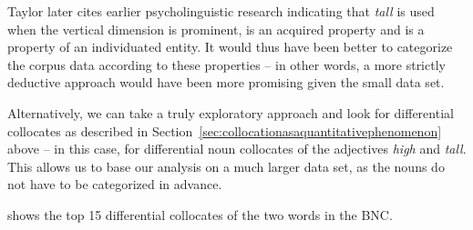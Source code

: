 Taylor later cites earlier psycholinguistic  research indicating that \textit{tall} is used when the vertical dimension is prominent, is an acquired property and is a property of an individuated entity. It would thus have been better to categorize  the corpus data according to these properties -- in other words, a more strictly deductive  approach would have been more promising given the small data set.

Alternatively, we can take a truly exploratory approach and look for differential collocates  as described in Section~\ref{sec:collocationasaquantitativephenomenon} above -- in this case, for differential noun  collocates of the adjectives  \textit{high} and \textit{tall}. This allows us to base our analysis on a much larger  data set, as the nouns do not have to be categorized  in advance.

 shows the top 15 differential collocates  of the two words in the  BNC.\pagebreak

